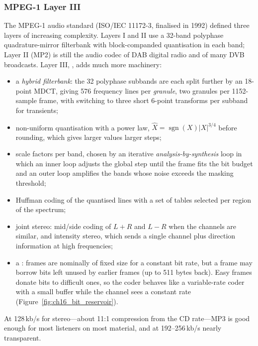 \subsubsection{MPEG-1 Layer III}

The MPEG-1 audio standard (ISO/IEC 11172-3, finalised in 1992) defined three layers of increasing
complexity. Layers I and II use a 32-band polyphase quadrature-mirror filterbank with block-companded
quantisation in each band; Layer II (MP2) is still the audio codec of DAB digital radio and of many
DVB broadcasts. Layer III, , adds much more machinery:
\begin{itemize}[nosep]
\item a \emph{hybrid filterbank}: the 32 polyphase subbands are each split further by an 18-point MDCT,
giving 576 frequency lines per \emph{granule}, two granules per 1152-sample frame, with switching to
three short 6-point transforms per subband for transients;
\item non-uniform quantisation with a power law, $\hat X=\operatorname{sgn}(X)|X|^{3/4}$ before rounding,
which gives larger values larger steps;
\item scale factors per band, chosen by an iterative \emph{analysis-by-synthesis} loop in which an inner
loop adjusts the global step until the frame fits the bit budget and an outer loop amplifies the bands
whose noise exceeds the masking threshold;
\item Huffman coding of the quantised lines with a set of tables selected per region of the spectrum;
\item joint stereo: mid/side coding of $L+R$ and $L-R$ when the channels are similar, and intensity
stereo, which sends a single channel plus direction information at high frequencies;
\item a : frames are nominally of fixed size for a constant bit rate, but a frame may
borrow bits left unused by earlier frames (up to 511 bytes back). Easy frames donate bits to difficult
ones, so the coder behaves like a variable-rate coder with a small buffer while the channel sees a
constant rate (Figure~\ref{fig:ch16_bit_reservoir}).
\end{itemize}

At 128\,kb/s for stereo---about 11:1 compression from the CD rate---MP3 is good enough for most
listeners on most material, and at 192--256\,kb/s nearly transparent.



